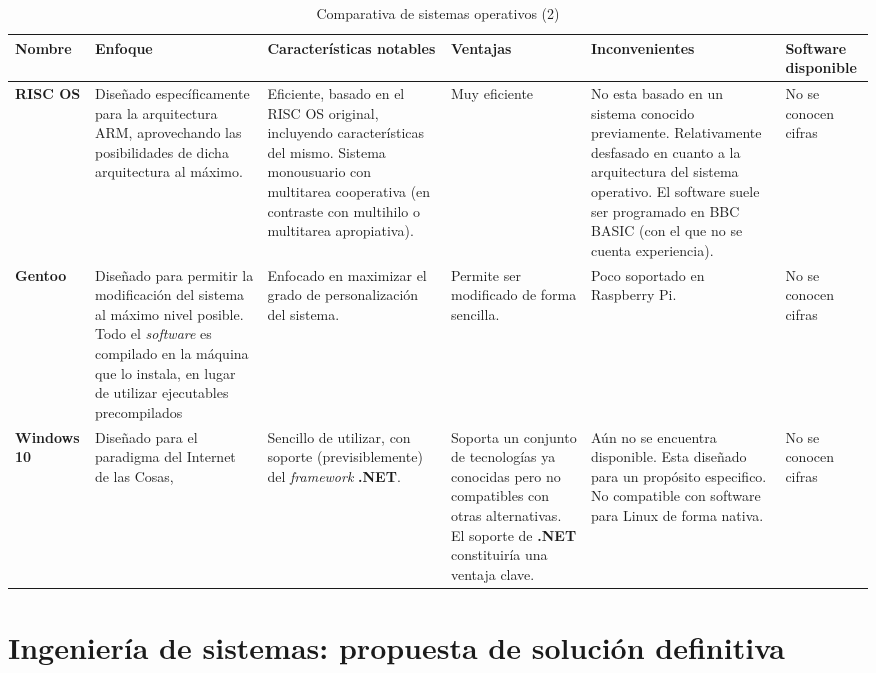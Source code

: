 \begin{landscape}
\begin{table}[h]
\begin{tabular}{|p{1.7cm}|p{4.7cm}|p{4.7cm}|p{3cm}|p{5cm}|p{2cm}|}
\hline
\textbf{Nombre} & \textbf{Enfoque} & \textbf{Características notables} & \textbf{Ventajas} & \textbf{Inconvenientes} & \textbf{Software disponible}\\ \hline

\textbf{RISC OS} & Diseñado específicamente para la arquitectura ARM, aprovechando las posibilidades de dicha arquitectura al máximo. & Eficiente, basado en el RISC OS original, incluyendo características del mismo. Sistema monousuario con multitarea cooperativa (en contraste con multihilo o multitarea apropiativa). & Muy eficiente & No esta basado en un sistema conocido previamente. Relativamente desfasado en cuanto a la arquitectura del sistema operativo. El software suele ser programado en BBC BASIC (con el que no se cuenta experiencia). & No se conocen cifras\\ \hline

\textbf{Gentoo} & Diseñado para permitir la modificación del sistema al máximo nivel posible. Todo el \textit{software} es compilado en la máquina que lo instala, en lugar de utilizar ejecutables precompilados & Enfocado en maximizar el grado de personalización del sistema. & Permite ser modificado de forma sencilla. & Poco soportado en Raspberry Pi. & No se conocen cifras\\ \hline

\textbf{Windows 10} & Diseñado para el paradigma del Internet de las Cosas, & Sencillo de utilizar, con soporte (previsiblemente) del \textit{framework} \textbf{.NET}. & Soporta un conjunto de tecnologías ya conocidas pero no compatibles con otras alternativas. El soporte de \textbf{.NET} constituiría una ventaja clave.& Aún no se encuentra disponible\cite{windows10raspberry}. Esta diseñado para un propósito especifico. No compatible con software para Linux de forma nativa. & No se conocen cifras\\ \hline

\end{tabular}
\caption{Comparativa de sistemas operativos (2)}
\end{table}
\end{landscape}


\section{Ingeniería de sistemas: propuesta de solución definitiva}


